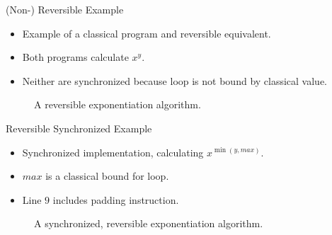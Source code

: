 \begin{frame}{(Non-) Reversible Example}
    \begin{itemize}
        \item Example of a classical program and reversible equivalent.
        \item Both programs calculate $x^y$. 
        \item Neither are synchronized because loop is not bound by classical value.
    \end{itemize}
    \vfill
    \begin{figure}[htp]
        \centering     
        \begin{minipage}{.40\textwidth}
            
            \caption{A non-reversible exponentiation algorithm.}
            \label{fig:qcm_not_reverse}
        \end{minipage}
        \hfill
        \begin{minipage}{.50\textwidth}
            
            \caption{A reversible exponentiation algorithm.}    
            \label{fig:qcm_reverse}
        \end{minipage}
    \end{figure}
\end{frame}

\begin{frame}{Reversible Synchronized Example}
    \begin{itemize}
        \item Synchronized implementation, calculating $x^{\min(y, max)}$.
        \item $max$ is a classical bound for loop.
        \item Line $9$ includes padding instruction.
    \end{itemize}
    \begin{figure}[htp]
        \centering     
        
        \caption{A synchronized, reversible exponentiation algorithm.}
        \label{fig:qcm_sync}
    \end{figure}
\end{frame}